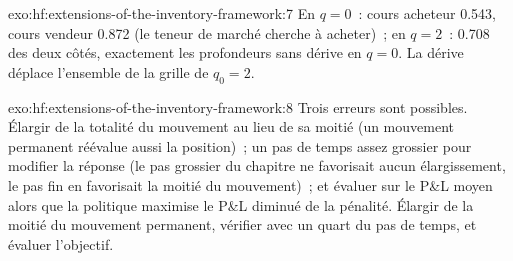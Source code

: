 \begin{solution}{exo:hf:extensions-of-the-inventory-framework:7}
En $q=0$~: cours acheteur 0.543, cours vendeur 0.872 (le teneur de marché cherche à acheter)~; en $q=2$~: 0.708 des deux côtés, exactement les profondeurs sans dérive en $q=0$. La dérive déplace
l'ensemble de la grille de $q_0=2$.
\end{solution}

\begin{solution}{exo:hf:extensions-of-the-inventory-framework:8}
Trois erreurs sont possibles. Élargir de la totalité du mouvement au lieu de sa moitié (un mouvement permanent réévalue aussi la position)~; un pas de temps assez grossier pour modifier la réponse
(le pas grossier du chapitre ne favorisait aucun élargissement, le pas fin en favorisait la moitié du mouvement)~; et évaluer sur le P\&L moyen alors que la politique maximise le P\&L
diminué de la pénalité. Élargir de la moitié du mouvement permanent, vérifier avec un quart du pas de temps, et évaluer l'objectif.
\end{solution}

